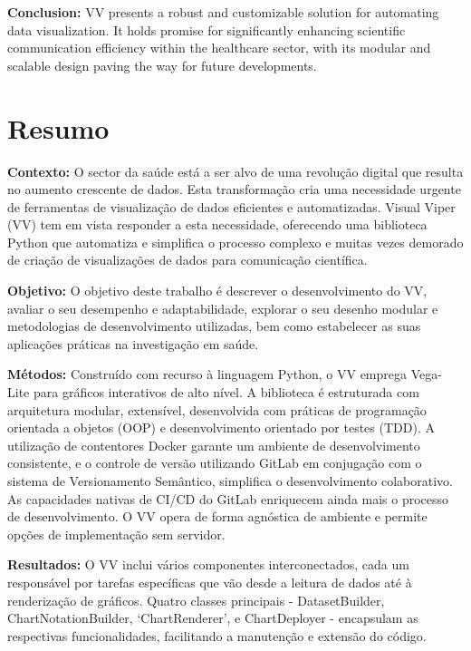 \textbf{Conclusion:} VV presents a robust and customizable solution for automating data
visualization. It holds promise for significantly enhancing scientific
communication efficiency within the healthcare sector, with its modular
and scalable design paving the way for future developments.

\clearpage
\begingroup
\pagestyle{empty}\cleardoublepage
\endgroup

\chapter*{Resumo}\label{resumo}
\thispagestyle{plain}

\textbf{Contexto:} O sector da saúde está a ser alvo de uma revolução digital que resulta
no aumento crescente de dados. Esta transformação cria uma necessidade
urgente de ferramentas de visualização de dados eficientes e
automatizadas. Visual Viper (VV) tem em vista responder a esta
necessidade, oferecendo uma biblioteca Python que automatiza e
simplifica o processo complexo e muitas vezes demorado de criação de
visualizações de dados para comunicação científica.

\textbf{Objetivo:} O objetivo deste trabalho é descrever o desenvolvimento do VV, avaliar o
seu desempenho e adaptabilidade, explorar o seu desenho modular e
metodologias de desenvolvimento utilizadas, bem como estabelecer as suas
aplicações práticas na investigação em saúde.

\textbf{Métodos:} Construído com recurso à linguagem Python, o VV emprega Vega-Lite para
gráficos interativos de alto nível. A biblioteca é estruturada com
arquitetura modular, extensível, desenvolvida com práticas de
programação orientada a objetos (OOP) e desenvolvimento orientado por
testes (TDD). A utilização de contentores Docker garante um ambiente de
desenvolvimento consistente, e o controle de versão utilizando GitLab em conjugação com o sistema de Versionamento Semântico, simplifica o
desenvolvimento colaborativo. As capacidades nativas de CI/CD do GitLab
enriquecem ainda mais o processo de desenvolvimento. O VV opera de forma
agnóstica de ambiente e permite opções de implementação sem servidor.

\textbf{Resultados:} O VV inclui vários componentes interconectados, cada um responsável por
tarefas específicas que vão desde a leitura de dados até à renderização
de gráficos. Quatro classes principais -
\textquotesingle DatasetBuilder\textquotesingle,
\textquotesingle ChartNotationBuilder\textquotesingle, `ChartRenderer',
e \textquotesingle ChartDeployer\textquotesingle{} - encapsulam as
respectivas funcionalidades, facilitando a manutenção e extensão do
código.

